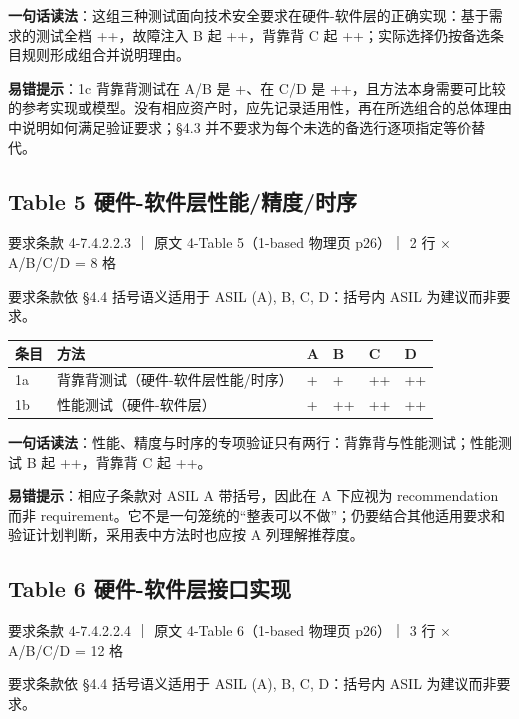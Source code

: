 \textbf{一句话读法}：这组三种测试面向技术安全要求在硬件-软件层的正确实现：基于需求的测试全档 ++，故障注入 B 起 ++，背靠背 C 起 ++；实际选择仍按备选条目规则形成组合并说明理由。

\textbf{易错提示}：1c 背靠背测试在 A/B 是 +、在 C/D 是 ++，且方法本身需要可比较的参考实现或模型。没有相应资产时，应先记录适用性，再在所选组合的总体理由中说明如何满足验证要求；§4.3 并不要求为每个未选的备选行逐项指定等价替代。

\subsection{Table 5 硬件-软件层性能/精度/时序}

要求条款 4-7.4.2.2.3 ｜ 原文 4-Table 5（1-based 物理页 p26）｜ 2 行 \(\times\) A/B/C/D = 8 格

\begin{noteblock}
要求条款依 §4.4 括号语义适用于 ASIL (A), B, C, D：括号内 ASIL 为建议而非要求。
\end{noteblock}

\begin{center}
\begingroup\small
\setlength{\tabcolsep}{4pt}
\begin{tabularx}{\linewidth}{@{}XXXXXX@{}}
\toprule
条目 & 方法 & A & B & C & D \\
\midrule
1a & 背靠背测试（硬件-软件层性能/时序） & + & + & ++ & ++ \\
1b & 性能测试（硬件-软件层） & + & ++ & ++ & ++ \\
\bottomrule
\end{tabularx}
\endgroup
\end{center}

\textbf{一句话读法}：性能、精度与时序的专项验证只有两行：背靠背与性能测试；性能测试 B 起 ++，背靠背 C 起 ++。

\textbf{易错提示}：相应子条款对 ASIL A 带括号，因此在 A 下应视为 recommendation 而非 requirement。它不是一句笼统的“整表可以不做”；仍要结合其他适用要求和验证计划判断，采用表中方法时也应按 A 列理解推荐度。

\subsection{Table 6 硬件-软件层接口实现}

要求条款 4-7.4.2.2.4 ｜ 原文 4-Table 6（1-based 物理页 p26）｜ 3 行 \(\times\) A/B/C/D = 12 格

\begin{noteblock}
要求条款依 §4.4 括号语义适用于 ASIL (A), B, C, D：括号内 ASIL 为建议而非要求。
\end{noteblock}

